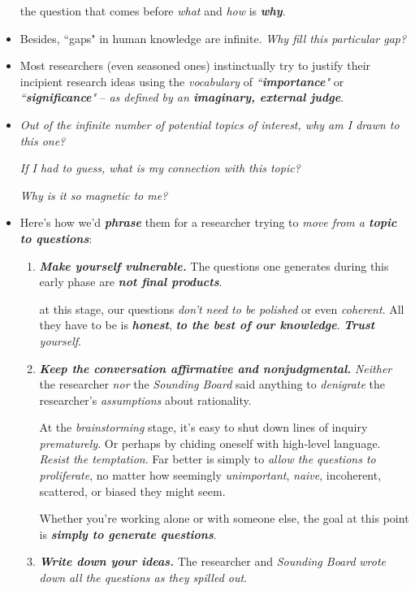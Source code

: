 \documentclass[11pt]{article}
\begin{document}
\begin{itemize}
the question that comes before \emph{what} and \emph{how} is \emph{\textbf{why}}.

\item Besides, ``gaps" in human knowledge are infinite. \emph{Why fill this particular gap?}

\item Most researchers (even seasoned ones) instinctually try to justify their incipient research ideas using the \emph{vocabulary} of \emph{``\textbf{importance}"} or \textit{``\textbf{significance}"} -- \emph{as defined by an \textbf{imaginary, external judge}}. 

\item \emph{Out of the infinite number of potential topics of interest, why am I drawn to this one?} 

\emph{If I had to guess, what is my connection with this topic?} 

\emph{Why is it so magnetic to me?}

\item Here’s how we’d \emph{\textbf{phrase}} them for a researcher trying to \emph{move from a \textbf{topic to questions}}:
\begin{enumerate}
\item \emph{\textbf{Make yourself vulnerable.}} The questions one generates during this early phase are \emph{\textbf{not final products}}.

at this stage, our questions \emph{don’t need to be polished} or even \emph{coherent}. All they have to be is \emph{\textbf{honest}}, \emph{\textbf{to the best of our knowledge}}. \emph{\textbf{Trust} yourself}.

\item \emph{\textbf{Keep the conversation affirmative and nonjudgmental.}} \emph{Neither} the researcher \emph{nor} the \emph{Sounding Board} said anything to \emph{denigrate} the researcher’s \textit{assumptions} about rationality.

At the \emph{brainstorming} stage, it’s easy to shut down lines of inquiry \emph{prematurely}. Or perhaps by chiding oneself with high-level language. \emph{Resist the temptation}. Far better is simply to \emph{allow the questions to proliferate}, no matter how seemingly \emph{unimportant}, \emph{naive}, incoherent, scattered, or biased they might seem.

Whether you’re working alone or with someone else, the goal at this point is \emph{\textbf{simply to generate questions}}.

\item \emph{\textbf{Write down your ideas.}} The researcher and \emph{Sounding Board} \emph{wrote down all the questions as they spilled out}.


\end{enumerate}
\end{itemize}
\end{document}
